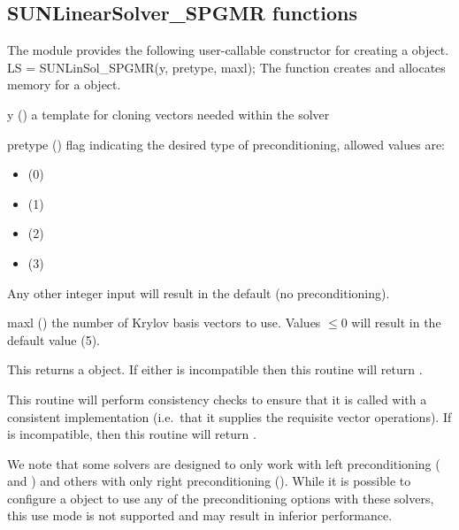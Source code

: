 \subsection{SUNLinearSolver\_SPGMR functions}
\label{ss:sunlinsol_spgmr_functions}

The {\sunlinsolspgmr} module provides the following user-callable constructor
for creating a \newline {} object.
%
%
{
  LS = SUNLinSol\_SPGMR(y, pretype, maxl);
}
{
  The function  creates and allocates memory for
  a {\spgmr} \newline {} object.
}
{
  \begin{args}[pretype]
  \item[y] ()
    a template for cloning vectors needed within the solver
  \item[pretype] ()
    flag indicating the desired type of preconditioning, allowed
    values are:
    \begin{itemize}
    \item {} (0)
    \item {} (1)
    \item {} (2)
    \item {} (3)
    \end{itemize}
    Any other integer input will result in the default (no
    preconditioning).
  \item[maxl] ()
    the number of Krylov basis vectors to use. Values $\le0$ will
    result in the default value (5).
  \end{args}
}
{
  This returns a  object.  If either  is
  incompatible then this routine will return .
}
{
  This routine will perform consistency checks to ensure that it is
  called with a consistent {\nvector} implementation (i.e.~that it
  supplies the requisite vector operations).  If  is
  incompatible, then this routine will return .

  We note that some {\sundials} solvers are designed to only work
  with left preconditioning ({\ida} and {\idas}) and others with only
  right preconditioning ({\kinsol}). While it is possible to configure
  a {\sunlinsolspgmr} object to use any of the preconditioning options
  with these solvers, this use mode is not supported and may result in
  inferior performance.
}
